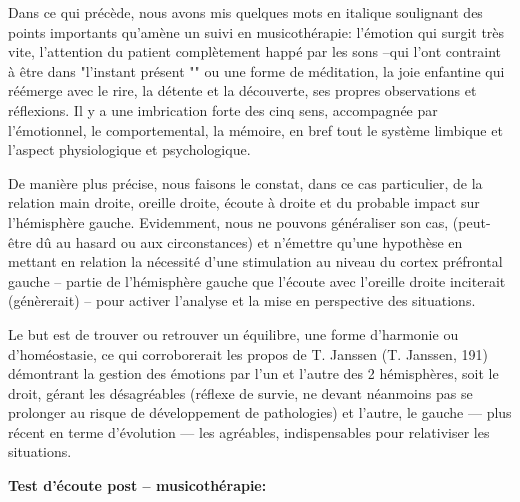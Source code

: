             Dans ce qui précède, nous avons mis quelques mots en italique soulignant des  points
            importants qu'amè\-ne un suivi en musicothérapie: l'émotion qui surgit très
            vite,
            l'attention du patient complètement happé par les sons --qui l'ont
            contraint à être dans "l'instant présent "" ou une forme de méditation, la joie
            enfantine qui réémerge avec le rire, la détente et la découverte,
            ses propres observations et réflexions.
            Il y a une imbrication forte des cinq sens, accompagnée par l'émotionnel, le comportemental, la
            mémoire, en bref tout le système limbique et l'aspect
            physiologique et psychologique.

            De manière plus précise, nous faisons le constat, dans ce cas
            particulier,  de la relation main droite, oreille droite, écoute
            à droite et du probable impact sur l'hémisphère gauche.
            Evidemment, nous ne pouvons généraliser son cas, (peut-être dû au hasard ou aux circonstances) et n'émettre qu'une hypothèse
            en mettant en relation la nécessité d'une stimulation au niveau du cortex préfrontal
            gauche -- partie de l'hémisphère gauche que l'écoute avec
            l'oreille droite inciterait (génèrerait) -- pour activer l'analyse et la
            mise en perspective des situations.

            Le but est de trouver ou
            retrouver un équilibre, une forme d'harmonie ou d'homéostasie, ce qui corroborerait les
            propos de T. Janssen (T. Janssen, 191)  démontrant la gestion des émotions par
            l'un et l'autre des 2 hémisphères, soit le droit,  gérant les désagréables
            (réflexe de survie, ne devant néanmoins pas se prolonger au risque de
            développement de pathologies)
            et l'autre, le gauche --- plus récent en terme d'évolution ---  les
            agréables, indispensables pour relativiser les situations.


            \textbf{ Test d'écoute post -- musicothérapie:}



